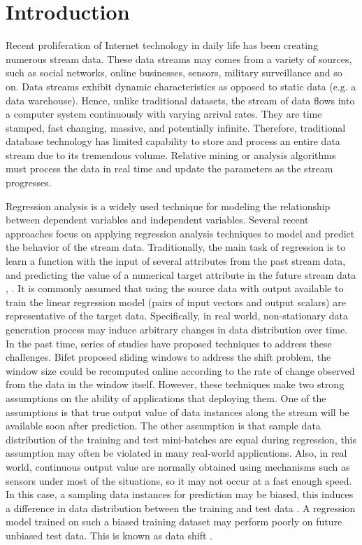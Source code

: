 \documentclass[conference,compsoc]{IEEEtran}
\begin{document}
\section{Introduction}
\label{introduction}

Recent  proliferation  of  Internet  technology  in daily life  has been creating numerous stream  data. These data 
streams may comes from  a
variety of sources, such as social networks, online businesses, sensors, military surveillance and so on. Data streams exhibit dynamic characteristics as opposed to static data (e.g. a data warehouse). Hence, unlike traditional datasets, the stream of data flows into a computer system continuously with varying 
arrival rates. They are time stamped, fast changing, massive, 
and potentially infinite. Therefore, traditional database technology has limited capability to store and process an entire data stream due to its tremendous volume. 
Relative mining or analysis algorithms must process the data in real time and update the parameters as the 
stream progresses. 

Regression analysis is a widely  used technique for modeling the relationship between dependent 
variables and independent variables\cite{Friedman}. Several recent approaches focus on applying regression analysis techniques to model and predict the behavior of the 
stream data. Traditionally, the main task of regression is to learn a function with the input of several attributes from the past stream data, and predicting the value of a numerical target attribute in the future stream data \cite{Gama}, \cite{Lughofer}. It is commonly assumed that using the source data with output available to train the linear regression model (pairs of input vectors and output scalars) are representative of the target data. Specifically, in real world, non-stationary  data generation process may 
induce arbitrary changes in data distribution over time. In the past time, series of studies  have  proposed 
techniques to address these challenges. 
Bifet\cite{bifet2007} proposed sliding windows to address the 
shift problem, the window size could be recomputed online according to the rate of change observed from the data in the 
window itself. However, these techniques make  two strong  assumptions on the ability of applications that deploying them. One of the assumptions is that true output value of data instances along the stream will be available soon after 
prediction. The other assumption is that  sample  data distribution of the training and test mini-batches are equal during regression, this assumption may often be violated in many real-world applications. 
Also, in real world, continuous output value are normally obtained using mechanisms such as sensors
under most of the situations, so it may not occur at a fast enough speed. In this case, a sampling data instances  for  prediction  may  be  biased, this  induces  a  difference  in  data  distribution  between  the  training  and test data \cite{braams:babel,clark:pct,herlihy:methodology}.  A regression model trained on such a biased training dataset may perform poorly on future unbiased test data. This is known as data shift \cite{Gama_drift}.
\end{document}
